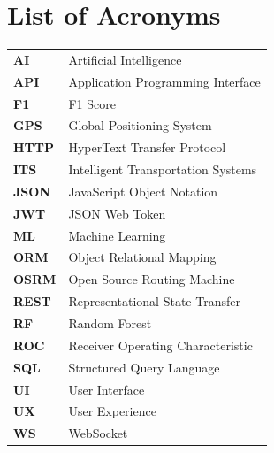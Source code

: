 \chapter*{List of Acronyms}

\begingroup
\setlength{\parskip}{6pt}
\renewcommand{\arraystretch}{1.4}

\noindent
\begin{tabular}{@{}p{3cm} p{11cm}@{}}

\textbf{AI}    & Artificial Intelligence \\
\textbf{API}   & Application Programming Interface \\
\textbf{F1}    & F1 Score \\
\textbf{GPS}   & Global Positioning System \\
\textbf{HTTP}  & HyperText Transfer Protocol \\
\textbf{ITS}   & Intelligent Transportation Systems \\
\textbf{JSON}  & JavaScript Object Notation \\
\textbf{JWT}   & JSON Web Token \\
\textbf{ML}    & Machine Learning \\
\textbf{ORM}   & Object Relational Mapping \\
\textbf{OSRM}  & Open Source Routing Machine \\
\textbf{REST}  & Representational State Transfer \\
\textbf{RF}    & Random Forest \\
\textbf{ROC}   & Receiver Operating Characteristic \\
\textbf{SQL}   & Structured Query Language \\
\textbf{UI}    & User Interface \\
\textbf{UX}    & User Experience \\
\textbf{WS}    & WebSocket \\

\end{tabular}

\endgroup